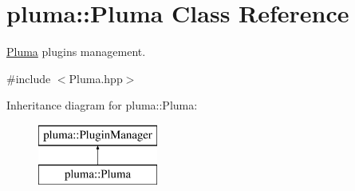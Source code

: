 \hypertarget{classpluma_1_1_pluma}{}\section{pluma\+:\+:Pluma Class Reference}
\label{classpluma_1_1_pluma}


\hyperlink{classpluma_1_1_pluma}{Pluma} plugins management.  




{\ttfamily \#include $<$Pluma.\+hpp$>$}

Inheritance diagram for pluma\+:\+:Pluma\+:\begin{figure}[H]
\begin{center}
\leavevmode
\includegraphics[height=2.000000cm]{classpluma_1_1_pluma}
\end{center}
\end{figure}
